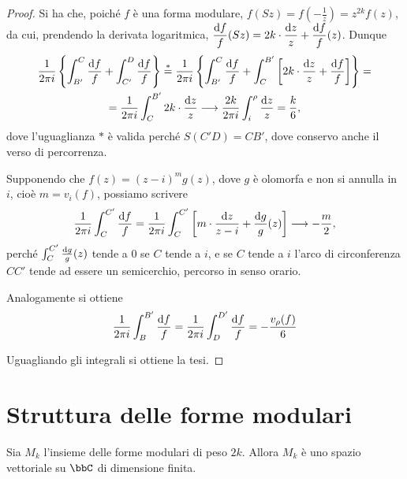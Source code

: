\begin{proof}
	Si ha che, poiché $f$ è una forma modulare, $f(Sz)=f(-\frac{1}{z})=z^{2k}f(z)$, da cui, prendendo la derivata logaritmica,
	$\displaystyle\frac{\text{d} f}{f}(Sz)=2k\cdot\frac{\text{d} z}{z}+\frac{\text{d} f}{f}(z)$. Dunque
	\begin{multline}
		\frac{1}{2\pi i}\left\{ \int_{B'}^C\frac{\de f}{f} + \int_{C'}^D\frac{\de f}{f} \right\} \overset{*}{=} %
		\frac{1}{2\pi i}\left\{ \int_{B'}^C\frac{\de f}{f} + \int_{C}^{B'} \left[2k \cdot \frac{\de z}{z} + \frac{\de f}{f}\right] \right\} = \\
		= \frac{1}{2\pi i}\int_{C}^{B'} 2k \cdot \frac{\de z}{z} \longrightarrow \frac{2k}{2\pi i}\int_i^\rho \frac{\de z}{z} = \frac{k}{6},
	\end{multline}
	dove l'uguaglianza $*$ è valida perché $S(C'D)=CB'$, dove conservo anche il verso di percorrenza.
	
	Supponendo che $f(z)=(z-i)^mg(z)$, dove $g$ è olomorfa e non si annulla in $i$, cioè $m=v_i(f)$, possiamo scrivere
	\begin{equation*}
		\frac{1}{2\pi i}\int_C^{C'}\frac{\de f}{f} = \frac{1}{2\pi i}\int_C^{C'}\left[ m\cdot\frac{\de z}{z-i} + %
		\frac{\de g}{g}(z) \right] \longrightarrow -\frac{m}{2},
	\end{equation*}
	perché $\int_C^{C'}\frac{\text{d} g}{g}(z)$ tende a $0$ se $C$ tende a $i$, e se $C$ tende a $i$ l'arco di circonferenza $CC'$ tende ad essere un semicerchio, percorso in senso orario.
	
	Analogamente si ottiene 
	\begin{equation*}
		\frac{1}{2\pi i}\int_B^{B'}\frac{\text{d} f}{f}=\frac{1}{2\pi i}\int_D^{D'}\frac{\text{d} f}{f}=-\frac{v_\rho(f)}{6}
	\end{equation*}
	
	Uguagliando gli integrali si ottiene la tesi.
\end{proof}

\section{Struttura delle forme modulari}

\begin{corollario}
	Sia $M_k$ l'insieme delle forme modulari di peso $2k$. Allora $M_k$ è uno spazio vettoriale su $\bbC$ di dimensione finita.
\end{corollario}

